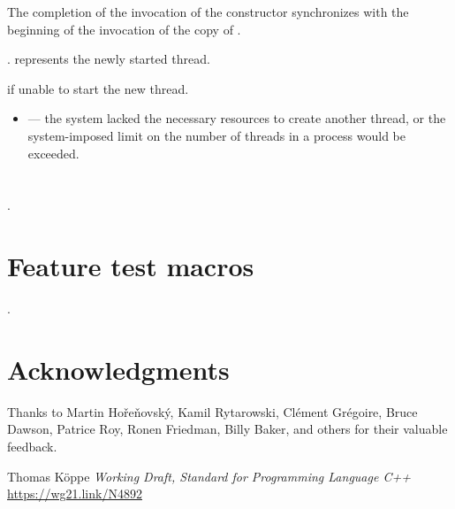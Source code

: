 \documentclass{wg21}
\begin{document}
\begin{itemdescr}
\pnum
\sync
The completion of the invocation of the constructor
synchronizes with the beginning of the invocation of the copy of .

\pnum
\ensures
{}.  represents the newly started thread.

\pnum
\throws
{} if unable to start the new thread.

\pnum
\errors
\begin{itemize}
    \item {} --- the system lacked the necessary
    resources to create another thread, or the system-imposed limit on the number of
    threads in a process would be exceeded.
\end{itemize}
\end{itemdescr}

\section{}

.

\section{Feature test macros}

.


\section{Acknowledgments}

Thanks to Martin Hořeňovský, Kamil Rytarowski, Clément Grégoire, Bruce Dawson, Patrice Roy, Ronen Friedman, Billy Baker, and others for their valuable feedback.






\renewcommand{\section}[2]{}%
\begin{thebibliography}{9}

    Thomas Köppe
    \emph{Working Draft, Standard for Programming Language C++}\newline
    \url{https://wg21.link/N4892}

\end{thebibliography}
\end{document}
